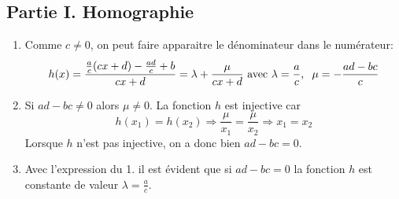 \subsection*{Partie I. Homographie}
\begin{enumerate}
 \item Comme $c\neq0$, on peut faire apparaitre le dénominateur dans le numérateur:
\begin{displaymath}
 h(x) = \frac{\frac{a}{c}(cx+d)-\frac{ad}{c}+b}{cx+d}
=\lambda + \frac{\mu}{cx+d}
\text{ avec }
\lambda=\frac{a}{c},\hspace{0.2cm}\mu =-\frac{ad-bc}{c}
\end{displaymath}

 \item Si $ad-bc\neq 0$ alors $\mu\neq 0$. La fonction $h$ est injective car 
\begin{displaymath}
 h(x_1) = h(x_2)\Rightarrow \frac{\mu}{x_1}=\frac{\mu}{x_2}\Rightarrow x_1 = x_2
\end{displaymath}
Lorsque $h$ n'est pas injective, on a donc bien $ad-bc=0$.
 \item Avec l'expression du 1. il est évident que si $ad-bc=0$ la fonction $h$ est constante de valeur $\lambda=\frac{a}{c}$.
\end{enumerate}

